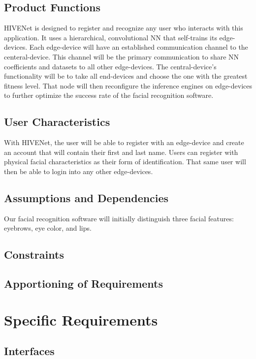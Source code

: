 \documentclass[onecolumn, draftclsnofoot,10pt, compsoc]{IEEEtran}
\begin{document}
	\subsection{Product Functions}
HIVENet is designed to register and recognize any user who interacts with this application. 
It uses a hierarchical, convolutional NN that self-trains its edge-devices.
Each edge-device will have an established communication channel to the centeral-device.
This channel will be the primary communication to share NN coefficients and datasets to all other edge-devices.
The central-device's functionality will be to take all end-devices and choose the one with the greatest fitness level.
That node will then reconfigure the inference engines on edge-devices to further optimize the success rate of the facial recognition software.

	\subsection{User Characteristics}
With HIVENet, the user will be able to register with an edge-device and create an account that will contain their first and last name.
Users can register with physical facial characteristics as their form of identification.
That same user will then be able to login into any other edge-devices.

	\subsection{Assumptions and Dependencies}
Our facial recognition software will initially distinguish three facial features: eyebrows, eye color, and lips.

	\subsection{Constraints}

	\subsection{Apportioning of Requirements}

	\newpage


\section{Specific Requirements}
	\subsection{Interfaces}
\end{document}
